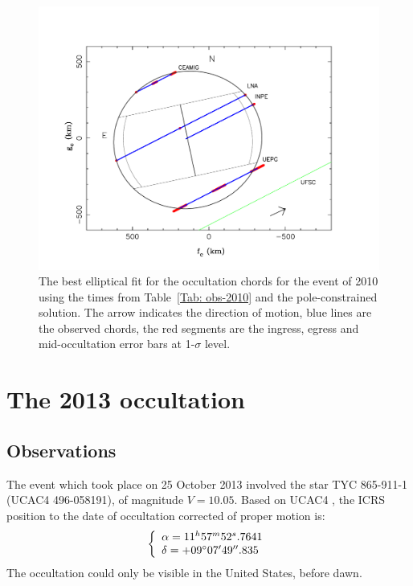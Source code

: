 \documentclass[useAMS,usenatbib]{mn2e}
\begin{document}
\begin{figure}
\includegraphics[scale=0.36]{figures/Ceres_2010_sphere.pdf} 
\caption{The best elliptical fit for the occultation chords for the event of 2010 using the times from Table~\ref{Tab: obs-2010} and the pole-constrained solution. The arrow indicates the direction of motion, blue lines are the observed chords, the red segments are the ingress, egress and mid-occultation error bars at 1-$\sigma$ level. \label{Fig:Ceres-2010-body}}
\end{figure}







\section{The 2013 occultation}

\subsection{Observations}\label{Sec: observation-2013}

The event which took place on 25 October 2013 involved the star TYC 865-911-1 (UCAC4 496-058191), of magnitude $V = 10.05$. Based on UCAC4 \citep{Zacharias2013}, the ICRS position to the date of occultation corrected of proper motion is:
%
\begin{equation}
\left\{ 
  \begin{array}{l l}
    \alpha = 11^{h}57^{m}52^{s}.7641\\
    \delta = +09\hbox{$^\circ$} 07\hbox{$^\prime$} 49\hbox{$^{\prime\prime}$}.835
  \end{array}
\right.
\end{equation}
%
The occultation could only be visible in the United States, before dawn.%
\end{document}
